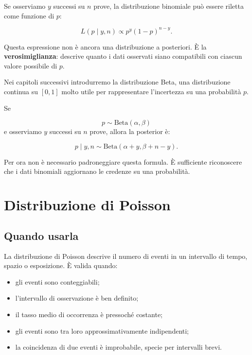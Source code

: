 \documentclass[
  italian,
  letterpaper,
  a4paper,
  11pt,
  open=any]{scrbook}
\providecommand{\tightlist}{%
  \setlength{\itemsep}{0pt}\setlength{\parskip}{0pt}}
\theoremstyle{plain}
\theoremstyle{definition}
\theoremstyle{definition}
\theoremstyle{remark}
\begin{document}
Se osserviamo \(y\) successi su \(n\) prove, la distribuzione binomiale
può essere riletta come funzione di \(p\):

\[
L(p \mid y,n) \propto p^y(1-p)^{n-y}.
\]

Questa espressione non è ancora una distribuzione a posteriori. È la
\textbf{verosimiglianza}: descrive quanto i dati osservati siano
compatibili con ciascun valore possibile di \(p\).

\begin{tcolorbox}[enhanced jigsaw, arc=.35mm, bottomrule=.15mm, bottomtitle=1mm, breakable, colback=white, colbacktitle=quarto-callout-note-color!10!white, colframe=quarto-callout-note-color-frame, coltitle=black, left=2mm, leftrule=.75mm, opacityback=0, opacitybacktitle=0.6, rightrule=.15mm, title=\textcolor{quarto-callout-note-color}{\faInfo}\hspace{0.5em}{Anticipazione: prior Beta e aggiornamento}, titlerule=0mm, toprule=.15mm, toptitle=1mm]

Nei capitoli successivi introdurremo la distribuzione Beta, una
distribuzione continua su \([0,1]\) molto utile per rappresentare
l'incertezza su una probabilità \(p\).

Se

\[
p \sim \mathrm{Beta}(\alpha,\beta)
\] e osserviamo \(y\) successi su \(n\) prove, allora la posterior è:

\[
p \mid y,n \sim \mathrm{Beta}(\alpha+y,\beta+n-y).
\]

Per ora non è necessario padroneggiare questa formula. È sufficiente
riconoscere che i dati binomiali aggiornano le credenze su una
probabilità.

\end{tcolorbox}

\section{Distribuzione di Poisson}\label{sec-poisson-distribution}

\subsection{Quando usarla}\label{quando-usarla}

La distribuzione di Poisson descrive il numero di eventi in un
intervallo di tempo, spazio o esposizione. È valida quando:

\begin{itemize}
\tightlist
\item
  gli eventi sono conteggiabili;
\item
  l'intervallo di osservazione è ben definito;
\item
  il tasso medio di occorrenza è pressoché costante;
\item
  gli eventi sono tra loro approssimativamente indipendenti;
\item
  la coincidenza di due eventi è improbabile, specie per intervalli
  brevi.
\end{itemize}
\end{document}
